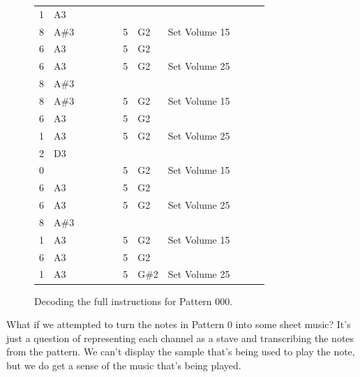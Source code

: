 \begin{figure}[H]
{\begin{adjustbox}{width=11cm,center}
\begin{tabular}{llllllllllll}
1 & A3 &   &   &   &   &   &   &   &   &   &   \\
8 & A\#3 &   &   &   &   & 5 & G2 & Set Volume 15 &   &   &   \\
6 & A3 &   &   &   &   & 5 & G2 &   &   &   &   \\
6 & A3 &   &   &   &   & 5 & G2 & Set Volume 25 &   &   &   \\
8 & A\#3 &   &   &   &   &   &   &   &   &   &   \\
8 & A\#3 &   &   &   &   & 5 & G2 & Set Volume 15 &   &   &   \\
6 & A3 &   &   &   &   & 5 & G2 &   &   &   &   \\
1 & A3 &   &   &   &   & 5 & G2 & Set Volume 25 &   &   &   \\
2 & D3 &   &   &   &   &   &   &   &   &   &   \\
0 &   &   &   &   &   & 5 & G2 & Set Volume 15 &   &   &   \\
6 & A3 &   &   &   &   & 5 & G2 &   &   &   &   \\
6 & A3 &   &   &   &   & 5 & G2 & Set Volume 25 &   &   &   \\
8 & A\#3 &   &   &   &   &   &   &   &   &   &   \\
1 & A3 &   &   &   &   & 5 & G2 & Set Volume 15 &   &   &   \\
6 & A3 &   &   &   &   & 5 & G2 &   &   &   &   \\
1 & A3 &   &   &   &   & 5 & G\#2 & Set Volume 25 &   &   &   \\
        \bottomrule
      \end{tabular}
    \end{adjustbox}
  }\caption*{Decoding the full instructions for Pattern 000.}
\end{figure}
What if we attempted to turn the notes in Pattern 0 into some sheet music? It's just a question
of representing each channel as a stave and transcribing the notes from the pattern. We can't 
display the sample that's being used to play the note, but we do get a sense of the music
that's being played. 

